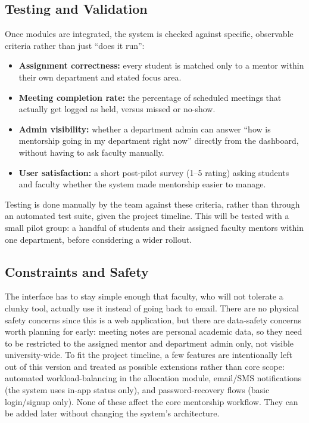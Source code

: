 \documentclass[11pt]{article}
\begin{document}
\subsection{Testing and Validation}
Once modules are integrated, the system is checked against specific, observable criteria rather than just ``does it run'':
\begin{itemize}[leftmargin=1.4em, itemsep=0.2em]
  \item \textbf{Assignment correctness:} every student is matched only to a mentor within their own department and stated focus area.
  \item \textbf{Meeting completion rate:} the percentage of scheduled meetings that actually get logged as held, versus missed or no-show.
  \item \textbf{Admin visibility:} whether a department admin can answer ``how is mentorship going in my department right now'' directly from the dashboard, without having to ask faculty manually.
  \item \textbf{User satisfaction:} a short post-pilot survey (1--5 rating) asking students and faculty whether the system made mentorship easier to manage.
\end{itemize}
Testing is done manually by the team against these criteria, rather than through an automated test suite, given the project timeline. This will be tested with a small pilot group: a handful of students and their assigned faculty mentors within one department, before considering a wider rollout.

\subsection{Constraints and Safety}
The interface has to stay simple enough that faculty, who will not tolerate a clunky tool, actually use it instead of going back to email. There are no physical safety concerns since this is a web application, but there are data-safety concerns worth planning for early: meeting notes are personal academic data, so they need to be restricted to the assigned mentor and department admin only, not visible university-wide. To fit the project timeline, a few features are intentionally left out of this version and treated as possible extensions rather than core scope: automated workload-balancing in the allocation module, email/SMS notifications (the system uses in-app status only), and password-recovery flows (basic login/signup only). None of these affect the core mentorship workflow. They can be added later without changing the system's architecture.
\end{document}
